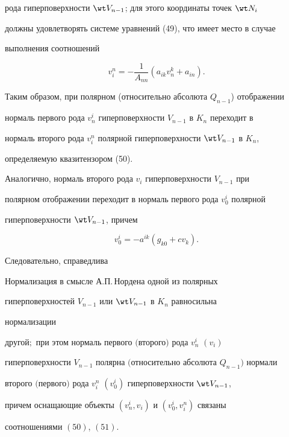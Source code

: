 рода гиперповерхности $\wt V_{n-1}$; для этого координаты точек $\wt N_i$ 


должны удовлетворять системе уравнений (49), что имеет место в случае 


выполнения соотношений 


\begin{equation} 


v^n_i=-\frac{1}{A_{nn}}(a_{ik}v^k_n+a_{in}). 


\end{equation} 


 


Таким образом, при полярном (относительно абсолюта $Q_{n-1}$) отображении 


нормаль первого рода $v^i_n$ гиперповерхности $V_{n-1}$ в $K_n$ переходит в 


нормаль второго рода $v^n_i$ полярной гиперповерхности $\wt V_{n-1}$ в $K_n$, 


определяемую квазитензором (50). 


 


Аналогично, нормаль второго рода $v_i$ гиперповерхности $V_{n-1}$ при 


полярном отображении переходит в нормаль первого рода $v^i_0$ полярной 


гиперповерхности $\wt V_{n-1}$, причем 


\begin{equation} 


v^i_0=-a^{ik}(g_{k0}+c v_k). 


\end{equation} 


 


Следовательно, справедлива 


 


\begin{thm} 


Нормализация в смысле А.П.\,Нордена одной из полярных 


гиперповерхностей $V_{n-1}$ или $\wt V_{n-1}$ в $K_n$ равносильна 


нормализации 


другой$;$ при этом нормаль первого $($второго$)$ рода $v^i_n$ $(v_i)$ 


гиперповерхности $V_{n-1}$ полярна $($относительно абсолюта $Q_{n-1})$ нормали 


второго $($первого$)$ рода $v^n_i$ $(v^i_0)$ гиперповерхности $\wt V_{n-1}$, 


причем оснащающие объекты $(v^i_n,v_i)$ и $(v^i_0,v^n_i)$ связаны 


соотношениями $(50)$, $(51)$. 


\end{thm} 


